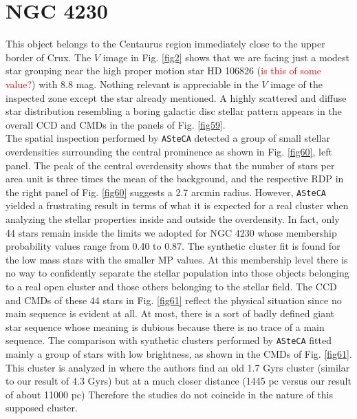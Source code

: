 \documentclass[draft]{aa}
\begin{document}
\section{NGC 4230}

This object belongs to the Centaurus region immediately close to the upper
border of Crux. The $V$ image in Fig. \ref{fig2} shows that we are facing just a
modest star grouping near the high proper motion star HD 106826
(\textcolor{red}{is this of some value?}) with 8.8 mag. Nothing relevant is
appreciable in the $V$ image of the inspected zone except the star already
mentioned. A highly scattered and diffuse star distribution resembling a boring
galactic disc stellar pattern appears in the overall CCD and CMDs in the panels
of Fig. \ref{fig59}.\\

The spatial inspection performed by \texttt{ASteCA} detected a group of small
stellar overdensities surrounding the central prominence as shown in Fig.
\ref{fig60}, left panel. The peak of the central overdensity shows that the
number of stars per area unit is three times the mean of the background, and the
respective RDP in the right panel of Fig. \ref{fig60} suggests a 2.7 arcmin
radius. However, \texttt{ASteCA} yielded a frustrating result in terms of what
it is expected for a real cluster when analyzing the stellar properties inside
and outside the overdensity. In fact, only 44 stars remain inside the limits we
adopted for NGC 4230 whose membership probability values range from 0.40 to
0.87. The synthetic cluster fit is found for the low mass stars with the
smaller MP values. At this membership level there is no way to confidently
separate the stellar population into those objects belonging to a real open
cluster and those others belonging to the stellar field. The CCD and CMDs of
these 44 stars in Fig. \ref{fig61} reflect the physical situation since no main
sequence is evident at all. At most, there is a sort of badly defined giant
star sequence whose meaning is dubious because there is no trace of a main
sequence. The comparison with synthetic clusters performed by \texttt{ASteCA}
fitted mainly a group of stars with low brightness, as shown in the CMDs of
Fig. \ref{fig61}. This cluster is analyzed in \cite{Tadross_2011} where the
authors find an old 1.7 Gyrs cluster (similar to our result of 4.3 Gyrs) but at
a much closer distance (1445 pc versus our result of about 11000 pc) Therefore
the studies do not coincide in the nature of this supposed cluster.\\
\end{document}
